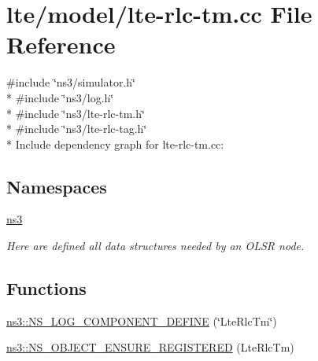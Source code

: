 \hypertarget{lte-rlc-tm_8cc}{}\section{lte/model/lte-\/rlc-\/tm.cc File Reference}
\label{lte-rlc-tm_8cc}
{\ttfamily \#include \char`\"{}ns3/simulator.\+h\char`\"{}}\\*
{\ttfamily \#include \char`\"{}ns3/log.\+h\char`\"{}}\\*
{\ttfamily \#include \char`\"{}ns3/lte-\/rlc-\/tm.\+h\char`\"{}}\\*
{\ttfamily \#include \char`\"{}ns3/lte-\/rlc-\/tag.\+h\char`\"{}}\\*
Include dependency graph for lte-\/rlc-\/tm.cc\+:
\subsection*{Namespaces}
\begin{DoxyCompactItemize}
\item 
 \hyperlink{namespacens3}{ns3}
\begin{DoxyCompactList}\small\item\em Here are defined all data structures needed by an O\+L\+SR node. \end{DoxyCompactList}\end{DoxyCompactItemize}
\subsection*{Functions}
\begin{DoxyCompactItemize}
\item 
\hyperlink{namespacens3_ab3fd7113743f45691696e1d35dc8576c}{ns3\+::\+N\+S\+\_\+\+L\+O\+G\+\_\+\+C\+O\+M\+P\+O\+N\+E\+N\+T\+\_\+\+D\+E\+F\+I\+NE} (\char`\"{}Lte\+Rlc\+Tm\char`\"{})
\item 
\hyperlink{namespacens3_ad4f3b2bc8fd7a990d56547ef8b02a1be}{ns3\+::\+N\+S\+\_\+\+O\+B\+J\+E\+C\+T\+\_\+\+E\+N\+S\+U\+R\+E\+\_\+\+R\+E\+G\+I\+S\+T\+E\+R\+ED} (Lte\+Rlc\+Tm)
\end{DoxyCompactItemize}
